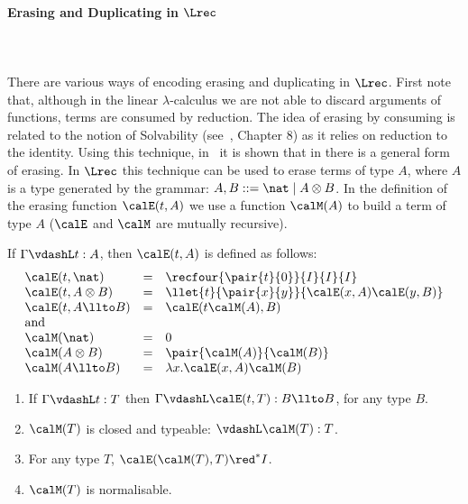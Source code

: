 \documentclass{article}
\begin{document}
\paragraph*{Erasing and Duplicating in $\Lrec$}\ \\\ \\
There are various ways of encoding erasing and duplicating in $\Lrec$.
First note that, although in the linear $\lambda$-calculus we are not able to discard
arguments of functions, terms are consumed by reduction. The idea of
erasing by consuming is related to the notion of Solvability
(see~\cite{BarendregtHP:lamcss}, Chapter 8)  as it relies on
reduction to the identity. Using this technique,
in~\cite{AlvesS:phd,AlvesS:TCS} it is shown that in \LLCI there is a
general form of erasing. In $\Lrec$ this technique can be used to erase 
 terms of type $A$, where $A$ is a type generated by the grammar:
$ A,B ::= \nat \mid A \otimes B$. In the definition of the erasing function $\calE(t,A)$ we use a function $\calM(A)$ to build a term of type $A$ ($\calE$ and $\calM$ are mutually
recursive).

\begin{definition}[Erasing] If $\Gamma \vdashL t:A$, then
  $\calE(t,A)$ is defined as follows:
\[
\begin{array}{lcl}
\calE(t,\nat) &=& \recfour{\pair{t}{0}}{I}{I}{I} \\
\calE(t,A\otimes B) &=& \llet{t}{\pair{x}{y}}{\calE(x,A)\calE(y,B)}\\
\calE(t,A\llto B) &=& \calE(t\calM(A),B)
\\
\mbox{and}
\\
\calM(\nat) &=& 0 \\
\calM(A\otimes B) &=& \pair{\calM(A)}{\calM(B)}\\
\calM(A\llto B) &=& \lambda x.\calE(x,A)\calM(B)
\end{array}
\]
\end{definition}

\begin{theorem}
\label{thm:erase1}
\begin{enumerate}
\item
If $\Gamma \vdashL t:T$ then $\Gamma \vdashL \calE(t,T): B \llto B$, for any type $B$.
\item $\calM(T)$ is  closed and typeable: $\vdashL \calM(T): T$. 
\item
For any type $T$, $\calE(\calM(T),T) \red^* I$. 
\item $\calM(T)$ is normalisable.
\end{enumerate}
\end{theorem}
\end{document}
